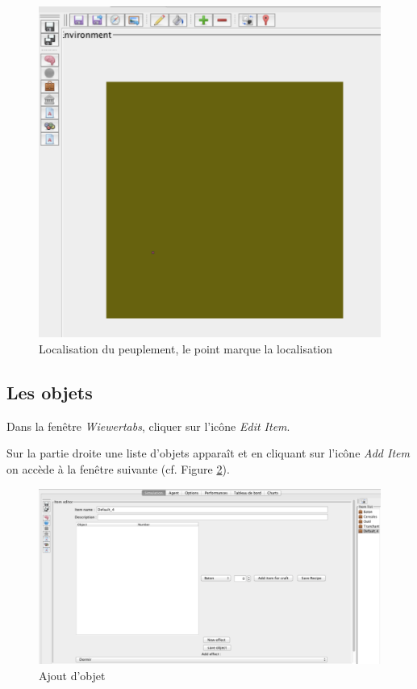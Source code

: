 \begin{figure}[!ht]
	\begin{center}
	\includegraphics[scale=0.4]{DocumentationSimulation/Local.pdf}
	\caption[Lo]{Localisation du peuplement, le point marque la localisation}
	\label{Lo}
	\end{center}
	\end{figure}
	
\subsection{Les objets}
Dans la fenêtre \textit{Wiewertabs}, cliquer sur l'icône \textit{Edit Item}.

Sur la partie droite une liste d'objets apparaît et en cliquant sur l'icône \textit{Add Item} on accède à la fenêtre suivante (cf. Figure \ref{Obj}).

\begin{figure}[!ht]
	\begin{center}
	\includegraphics[scale=0.3]{DocumentationSimulation/Objet.pdf}
	\caption[Obj]{Ajout d'objet \\}
	\label{Obj}
	\end{center}
	\end{figure}
	
